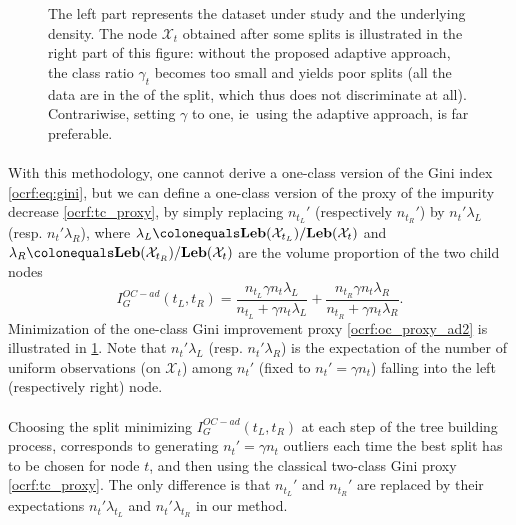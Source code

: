 \begin{figure}[ht!]
{}
\caption[Adaptative splitting criteria]{The left part represents
the dataset under study and the underlying density.  The node $\mathcal{X}_t$
obtained after some splits is illustrated in the right part of this figure:
without the proposed adaptive approach, the class ratio $\gamma_t$ becomes too
small and yields poor splits
(all the data are in the  of the split, which thus does not
discriminate at all).  Contrariwise, setting $\gamma$ to one, \acs{ie}~using
the adaptive approach, is far preferable.
 \label{ocrf:fig:split_alpha}}
\end{figure}
\paragraph{}
With this methodology, one cannot derive a one-class version of the Gini index
\cref{ocrf:eq:gini}, but we can define a one-class version of the proxy of the
impurity decrease \cref{ocrf:tc_proxy}, by simply replacing $n_{t_L}'$
(respectively $n_{t_R}'$) by $n_t' \lambda_L$ (resp. $n_t' \lambda_R$), where
$\lambda_L \colonequals \Leb(\mathcal{X}_{t_L}) / \Leb(\mathcal{X}_{t})$ and
$\lambda_R \colonequals \Leb(\mathcal{X}_{t_R}) / \Leb(\mathcal{X}_{t})$ are
the volume proportion of the two child nodes
%
\begin{dmath}
    \label{ocrf:oc_proxy_ad2}
    I_G^{OC-ad}(t_L, t_R)= \frac{n_{t_L} \gamma n_t \lambda_L}{n_{t_L} + \gamma
    n_t \lambda_L} + \frac{n_{t_R} \gamma n_t \lambda_R}{n_{t_R} + \gamma n_t
    \lambda_R}.
\end{dmath}
%
Minimization of the one-class Gini improvement proxy \cref{ocrf:oc_proxy_ad2}
is illustrated in \cref{ocrf:fig:split_alpha}.
Note that $n_t'\lambda_L$ (resp. $n_t'\lambda_R$) is the expectation of the
number of uniform  observations (on $\mathcal{X}_t$) among $n_t'$ (fixed to
$n_t' = \gamma n_t$) falling into the left (respectively right) node.
\paragraph{}
Choosing the split minimizing $I_G^{OC-ad}(t_L, t_R)$ at each step of the tree
building process, corresponds to generating $n_t' = \gamma n_t$ outliers each
time the best split has to be chosen for node $t$, and then using the classical
two-class Gini proxy \cref{ocrf:tc_proxy}. The only difference is that
$n_{t_L}'$ and $n_{t_R}'$ are replaced by their expectations
$n_t'\lambda_{t_L}$ and $n_t'\lambda_{t_R}$ in our method.

